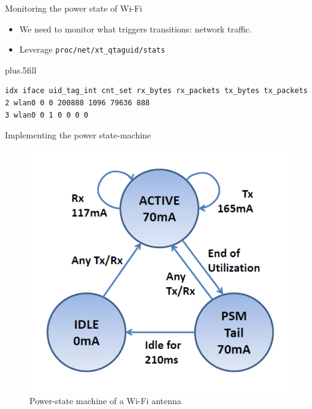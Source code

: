 %
%
\begin{frame}[fragile]{Monitoring the power state of Wi-Fi}
\begin{itemize}
\item We need to monitor what triggers transitions: \alert{network traffic}.
\item Leverage \texttt{proc/net/xt\_qtaguid/stats}
\end{itemize}
\vskip0pt plus.5fill
\begin{lstlisting}
idx iface uid_tag_int cnt_set rx_bytes rx_packets tx_bytes tx_packets
2 wlan0 0 0 200888 1096 79636 888
3 wlan0 0 1 0 0 0 0
\end{lstlisting}
\end{frame}
%
%
\begin{frame}{Implementing the power state-machine}
\begin{figure}
	\includegraphics[height=0.6\textheight]{figures/wifi_statemachine.png} 
	\caption{Power-state machine of a Wi-Fi antenna}
\end{figure}
\end{frame}
